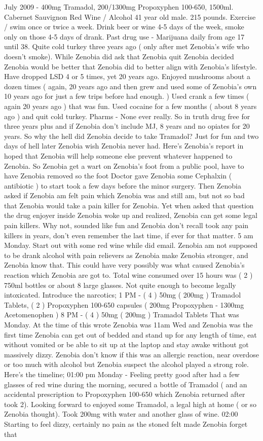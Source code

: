\documentclass[12pt]{book}
\begin{document}
July 2009 - 400mg Tramadol, 200/1300mg Propoxyphen 100-650, 1500ml. Cabernet Sauvignon Red Wine / Alcohol 41 year old male. 215 pounds. Exercise / swim once or twice a week. Drink beer or wine 4-5 days of the week, smoke only on those 4-5 days of drank. Past drug use - Marijuana daily from age 17 until 38. Quite cold turkey three years ago ( only after met Zenobia's wife who doesn't smoke). While Zenobia did ask that Zenobia quit Zenobia decided Zenobia would be better that Zenobia did to better align with Zenobia's lifestyle. Have dropped LSD 4 or 5 times, yet 20 years ago. Enjoyed mushrooms about a dozen times ( again, 20 years ago and then grew and used some of Zenobia's own 10 years ago for just a few trips before had enough. ) Used crank a few times ( again 20 years ago ) that was fun. Used cocaine for a few months ( about 8 years ago ) and quit cold turkey. Pharms - None ever really. So in truth drug free for three years plus and if Zenobia don't include MJ, 8 years and no opiates for 20 years. So why the hell did Zenobia decide to take Tramadol? Just for fun and two days of hell later Zenobia wish Zenobia never had. Here's Zenobia's report in hoped that Zenobia will help someone else prevent whatever happened to Zenobia. So Zenobia get a wart on Zenobia's foot from a public pool, have to have Zenobia removed so the foot Doctor gave Zenobia some Cephalxin ( antibiotic ) to start took a few days before the minor surgery. Then Zenobia asked if Zenobia am felt pain which Zenobia was and still am, but not so bad that Zenobia would take a pain killer for Zenobia. Yet when asked that question the drug enjoyer inside Zenobia woke up and realized, Zenobia can get some legal pain killers. Why not, sounded like fun and Zenobia don't recall took any pain killers in years, don't even remember the last time, if ever for that matter. 5 am Monday. Start out with some red wine while did email. Zenobia am not supposed to be drank alcohol with pain relievers as Zenobia make Zenobia stronger, and Zenobia know that. This could have very possibly was what caused Zenobia's reaction which Zenobia are got to. Total wine consumed over 15 hours was ( 2 ) 750ml bottles or about 8 large glasses. Not quite enough to become legally intoxicated. Introduce the narcotics; 1 PM - ( 4 ) 50mg ( 200mg ) Tramadol Tablets, ( 2 ) Propoxyphen 100-650 capsules ( 200mg Propoxyphen - 1300mg Acetomenophen ) 8 PM - ( 4 ) 50mg ( 200mg ) Tramadol Tablets That was Monday. At the time of this wrote Zenobia was 11am Wed and Zenobia was the first time Zenobia can get out of bedded and stand up for any length of time, eat without vomited or be able to sit up at the laptop and stay awake without got massively dizzy. Zenobia don't know if this was an allergic reaction, near overdose or too much with alcohol but Zenobia suspect the alcohol played a strong role. Here's the timeline; 01:00 pm Monday - Feeling pretty good after had a few glasses of red wine during the morning, secured a bottle of Tramadol ( and an accidental prescription to Propoxyphen 100-650 which Zenobia returned after took 2). Looking forward to enjoyed some Tramadol, a legal high at home ( or so Zenobia thought). Took 200mg with water and another glass of wine. 02:00 Starting to feel dizzy, certainly no pain as the stoned felt made Zenobia forget that 
\end{document}
